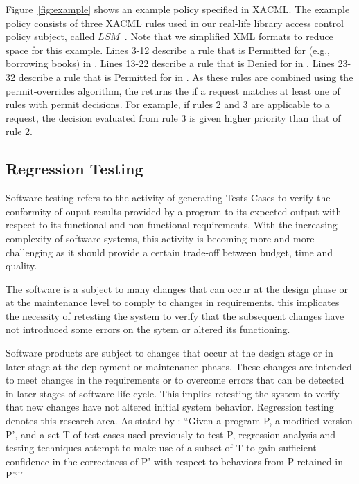 Figure~\ref{fig:example} shows an example policy specified
in XACML. The example policy consists of three XACML rules used in our real-life library access
control policy subject, called $LSM$~\cite{mouelhi09:tranforming}.
Note that we simplified XML formats to reduce
space for this example.
Lines 3-12 describe a rule that  is Permitted for   (e.g., borrowing books) in .
Lines 13-22 describe
a rule that  is Denied for   in .
Lines 23-32 describe
a rule that  is Permitted for   in .
As these rules are combined using the permit-overrides
algorithm, the  returns the
 if a request matches at least one of
rules with permit decisions. For example, if rules 2 and 3 are applicable to a request, the decision
evaluated from rule 3 is given higher priority than that of rule 2.


\subsection{Regression Testing}
Software testing \cite{Myers:1979:AST:539883} refers to the activity of generating Tests Cases to verify the conformity of ouput results provided by a program to its expected 
output with respect to its functional and non functional requirements. With the increasing complexity of software systems, this activity is becoming more and more challenging as it 
should provide a certain trade-off between budget, time and quality.

The software is a subject to many changes that can occur at the design phase or at the maintenance level to comply to changes in requirements.
this implicates the necessity of retesting the system to verify that the subsequent changes have not introduced some errors on the sytem or altered its functioning.

Software products are subject to changes that occur at the design stage or in later stage at the deployment or maintenance phases. These changes are intended to meet changes
 in the requirements or to overcome errors that can be detected in later stages of software life cycle. This implies retesting the system to verify that new changes have not altered 
initial system behavior. Regression testing denotes this research area. As stated by \cite{Rothermel:1996:ART:235681.235682}:
``Given a program P, a modified version P', and a set T of test cases used previously to test P, regression analysis and testing techniques attempt
to make use of a subset of T to gain sufficient confidence in the correctness of P' with respect to behaviors from P retained in P'.`''

